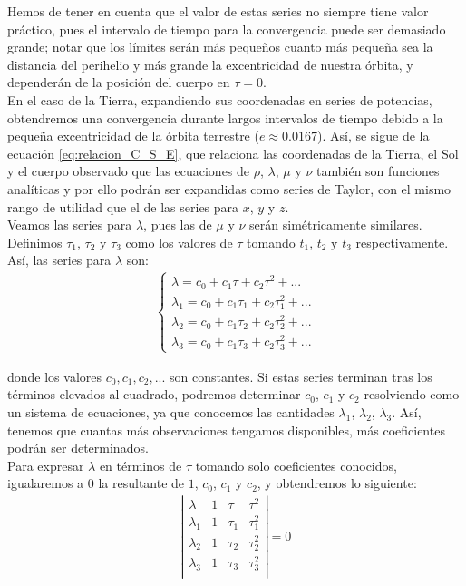 \documentclass[11pt]{article}
\begin{document}
Hemos de tener en cuenta que el valor de estas series no siempre tiene valor práctico, pues el intervalo de tiempo para la convergencia puede ser demasiado grande; notar que los límites serán más pequeños cuanto más pequeña sea la distancia del perihelio y más grande la excentricidad de nuestra órbita, y dependerán de la posición del cuerpo en $\tau=0$.\\

En el caso de la Tierra, expandiendo sus coordenadas en series de potencias, obtendremos una convergencia durante largos intervalos de tiempo debido a la pequeña excentricidad de la órbita terrestre ($e\approx0.0167$). Así, se sigue de la ecuación \eqref{eq:relacion_C_S_E}, que relaciona las coordenadas de la Tierra, el Sol y el cuerpo observado que las ecuaciones de $\rho$, $\lambda$, $\mu$ y $\nu$ también son funciones analíticas y por ello podrán ser expandidas como series de Taylor, con el mismo rango de utilidad que el de las series para $x$, $y$ y $z$.\\

Veamos las series para $\lambda$, pues las de $\mu$ y $\nu$ serán simétricamente similares. Definimos $\tau_1$, $\tau_2$ y $\tau_3$ como los valores de $\tau$ tomando $t_1$, $t_2$ y $t_3$ respectivamente. Así, las series para $\lambda$ son:
\begin{align}
\left\{
\begin{array}{l}
\lambda=c_0+c_1\tau+c_2\tau^2+...\\
\lambda_1=c_0+c_1\tau_1+c_2\tau_1^2+...\\
\lambda_2=c_0+c_1\tau_2+c_2\tau_2^2+...\\
\lambda_3=c_0+c_1\tau_3+c_2\tau_3^2+...
\end{array}
\right.
\label{eq:series_lambda}
\end{align}

\noindent donde los valores $c_0, c_1, c_2, ...$ son constantes. Si estas series terminan tras los términos elevados al cuadrado, podremos determinar $c_0$, $c_1$ y $c_2$ resolviendo como un sistema de ecuaciones, ya que conocemos las cantidades $\lambda_1$, $\lambda_2$, $\lambda_3$. Así, tenemos que cuantas más observaciones tengamos disponibles, más coeficientes podrán ser determinados.\\

Para expresar $\lambda$ en términos de $\tau$ tomando solo coeficientes conocidos, igualaremos a 0 la resultante de $1$, $c_0$, $c_1$ y $c_2$, y obtendremos lo siguiente:
\begin{align}
\left|
\begin{array}{cccc}
\lambda & 1 & \tau & \tau^2\\
\lambda_1 & 1 & \tau_1 & \tau^2_1\\
\lambda_2 & 1 & \tau_2 & \tau^2_2\\
\lambda_3 & 1 & \tau_3 & \tau^2_3\\
\end{array}
\right|
=0
\label{eq:resultante}
\end{align}
\end{document}
